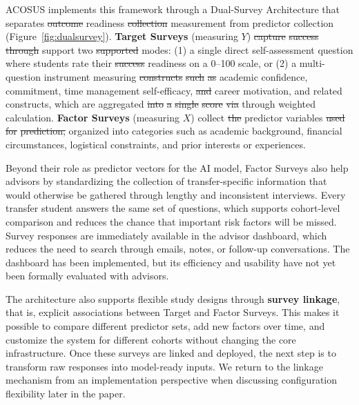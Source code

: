 \documentclass[letterpaper,11pt]{article}
\newcommand{\DIFdel}[1]{%
  \begingroup\setlength{\fboxsep}{0.5pt}%
  \colorbox{diffdelbg}{\textcolor{diffdeltext}{\sout{#1}}}%
  \endgroup}
\newcommand{\DIFadd}[1]{%
  \begingroup\setlength{\fboxsep}{0.5pt}%
  \colorbox{diffaddbg}{\textcolor{diffaddtext}{#1}}%
  \endgroup}
\begin{document}
ACOSUS implements this framework through a Dual-Survey Architecture that separates \DIFdel{outcome} \DIFadd{readiness} \DIFdel{collection} \DIFadd{measurement} from predictor collection (Figure~\ref{fig:dualsurvey}). \textbf{Target Surveys} (measuring $Y$) \DIFdel{capture} \DIFdel{success} \DIFdel{through} \DIFadd{support} two \DIFdel{supported} modes: (1) a single direct self-assessment question where students rate their \DIFdel{success} \DIFadd{readiness} on a 0--100 scale, or (2) a multi-question instrument measuring \DIFdel{constructs} \DIFdel{such} \DIFdel{as} academic confidence, commitment, time management self-efficacy, \DIFdel{and} career motivation, \DIFadd{and} \DIFadd{related} \DIFadd{constructs,} which are aggregated \DIFdel{into} \DIFdel{a} \DIFdel{single} \DIFdel{score} \DIFdel{via} \DIFadd{through} weighted calculation. \textbf{Factor Surveys} (measuring $X$) collect \DIFdel{the} predictor variables \DIFdel{used} \DIFdel{for} \DIFdel{prediction,} organized into categories such as academic background, financial circumstances, logistical constraints, and prior interests or experiences.

Beyond their role as predictor vectors for the AI model, Factor Surveys also help advisors by standardizing the collection of transfer-specific information that would otherwise be gathered through lengthy and inconsistent interviews. Every transfer student answers the same set of questions, which supports cohort-level comparison and reduces the chance that important risk factors will be missed. Survey responses are immediately available in the advisor dashboard, which reduces the need to search through emails, notes, or follow-up conversations. \DIFadd{The} \DIFadd{dashboard} \DIFadd{has} \DIFadd{been} \DIFadd{implemented,} \DIFadd{but} \DIFadd{its} \DIFadd{efficiency} \DIFadd{and} \DIFadd{usability} \DIFadd{have} \DIFadd{not} \DIFadd{yet} \DIFadd{been} \DIFadd{formally} \DIFadd{evaluated} \DIFadd{with} \DIFadd{advisors.}

The architecture also supports flexible study designs through \textbf{survey linkage}, that is, explicit associations between Target and Factor Surveys. This makes it possible to compare different predictor sets, add new factors over time, and customize the system for different cohorts without changing the core infrastructure. Once these surveys are linked and deployed, the next step is to transform raw responses into model-ready inputs. We return to the linkage mechanism from an implementation perspective when discussing configuration flexibility later in the paper.
\end{document}
